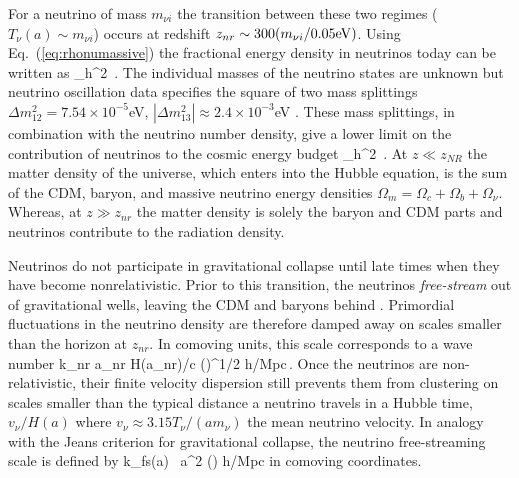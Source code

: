 For a neutrino of mass $m_{\nu i}$ the transition between these two regimes ($T_\nu(a) \sim m_{\nu i}$) occurs at redshift $z_{nr} \sim 300 (m_{\nu i}/0.05 {\rm eV})$. Using Eq.~(\ref{eq:rhonumassive}) the fractional energy density in neutrinos today can be written as
\beq
\Omega_\nu h^2 \approx {}\,.
\eeq
The individual masses of the neutrino states are unknown but neutrino oscillation data specifies the square of two mass splittings $\Delta m_{12}^2 = 7.54 \times 10^{-5}$eV, $|\Delta m_{13}^2|\approx 2.4 \times 10^{-3}$eV \cite{Agashe:2014kda}. These mass splittings, in combination with the neutrino number density, give a lower limit on the contribution of neutrinos to the cosmic energy budget
\beq
\Omega_\nu h^2 \,.
\eeq
At $z \ll z_{NR}$ the matter density of the universe, which enters into the Hubble equation, is the sum of the CDM, baryon, and massive neutrino energy densities $\Omega_m = \Omega_c + \Omega_b + \Omega_\nu$. Whereas, at $z\gg z_{nr}$ the matter density is solely the baryon and CDM parts and neutrinos contribute to the radiation density. 

Neutrinos do not participate in gravitational collapse until late times when they have become nonrelativistic. Prior to this transition, the neutrinos {\em free-stream} out of gravitational wells, leaving the CDM and baryons behind  \cite{Bond:1983hb, Ma:1996za, Hu:1997vi, Hu:1997mj}. Primordial fluctuations in the neutrino density are therefore damped away on scales smaller than the horizon at $z_{nr}$. In comoving units, this scale corresponds to a wave number
\beq
k_{nr} \equiv a_{nr} H(a_{nr})/c  \left(\right)^{1/2} h/{\rm Mpc}\,.
\eeq
Once the neutrinos are non-relativistic, their finite velocity dispersion still prevents them from clustering on scales smaller than the typical distance a neutrino travels in a Hubble time, $v_\nu /H(a)$ where $v_\nu \approx 3.15 T_\nu/(a m_\nu)$ the mean neutrino velocity. In analogy with the Jeans criterion for gravitational collapse, the neutrino free-streaming scale is defined by \cite{Bond:1983hb, Lesgourgues:2006nd}
\beq
k_{fs}(a) \equiv {} \, a^2 \left(\right) h/{\rm Mpc}
\eeq
in comoving coordinates. 

